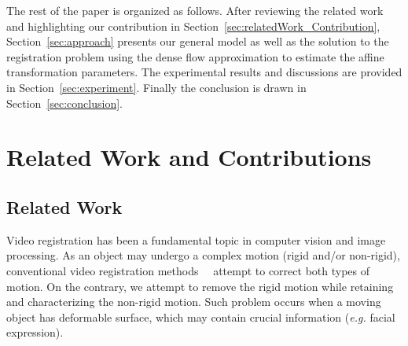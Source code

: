 \documentclass[10pt,journal]{IEEEtran}
\begin{document}
The rest of the paper is organized as follows. After reviewing the related work and highlighting our contribution in Section~\ref{sec:relatedWork_Contribution}, Section~\ref{sec:approach} presents our general model as well as the solution to the registration problem using the dense flow approximation to estimate the affine transformation parameters. The experimental results and discussions are provided in Section~\ref{sec:experiment}. Finally the conclusion is drawn in Section~\ref{sec:conclusion}.


\section{\label{sec:relatedWork_Contribution}Related Work and Contributions}

\subsection{\label{sec:related_work}Related Work}

Video registration has been a fundamental topic in computer vision and image processing. As an object may undergo a complex motion (rigid and/or non-rigid), conventional video registration methods~\cite{Uenohara95}~\cite{Caspi_PAMI02} attempt to correct both types of motion. On the contrary, we attempt to remove the rigid motion while retaining and characterizing the non-rigid motion. Such problem occurs when a moving object has deformable surface, which may contain crucial information (\textit{e.g.} facial expression).
\end{document}

